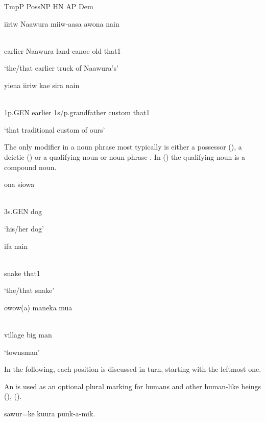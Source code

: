 TmpP  PossNP  HN  AP  Dem

\ea%
\label{ex:x393}
\gll iiriw  Naawura  miiw-aasa  awona  nain \\
      \\
\glt
\z

earlier  Naawura  land-canoe  old  that1

`the/that earlier truck of Naawura's'

\ea%
\label{ex:x394}
\gll yiena  iiriw  kae  sira  nain \\
      \\
\glt
\z

1p.GEN  earlier  1s/p.grandfather  custom  that1

`that traditional custom of ours'

The only modifier in a noun phrase most typically is either a possessor (), a deictic () or a qualifying noun or noun phrase . In () the qualifying noun is a compound noun.

\ea%
\label{ex:x395}
\gll ona  siowa \\
      \\
\glt
\z

3s.GEN  dog

`his/her dog'

\ea%
\label{ex:x396}
\gll ifa  nain \\
      \\
\glt
\z

snake  that1

`the/that snake'

\ea%
\label{ex:x397}
\gll owow(a)  maneka  mua \\
      \\
\glt
\z

village  big  man

`townsman'

In the following, each  position is discussed in turn, starting with the leftmost one.  

An  is used as an optional plural marking for humans and other human-like beings (), (). 

\ea%
\label{ex:x398}
\gll {}  sawur=ke  kuura  puuk-a-mik. \\
      \\
\glt
\z

